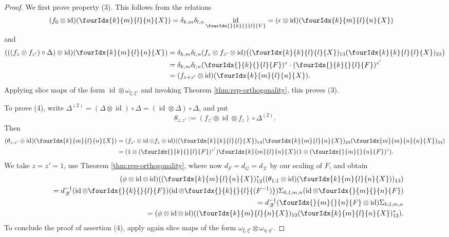 \documentclass[11pt]{article}
\DeclareMathOperator{\id}{id}
\newcommand{\Gr}[5]{\fourIdx{#2}{#4}{#3}{#5}{#1}}%
\newcommand{\Gru}[3]{\Gr{#1}{}{}{#2}{#3}}
\theoremstyle{definition}
\numberwithin{equation}{section}
\begin{document}
\begin{proof}
    We first prove property (3). This follows from the relations
    \begin{align*}
      (f_{0}  \otimes \id)(\Gr{X}{k}{l}{m}{n}) &=
      \delta_{k,m}\delta_{l,n} \id_{\Gru{V}{k}{l}} =
      (\epsilon \otimes \id)(\Gr{X}{k}{l}{m}{n})
    \end{align*}
    and
    \begin{align*}
      (((f_{z}\otimes f_{z'})\circ \Delta) \otimes
      \id)(\Gr{X}{k}{l}{m}{n}) &=  \delta_{k,m}\delta_{l,n}(f_{z} \otimes f_{z'} \otimes
      \id)\big((\Gr{X}{k}{l}{k}{l})_{13}
      (\Gr{X}{k}{l}{k}{l})_{23}\big) \\
      &=  \delta_{k,m}\delta_{l,n}(\Gru{F}{k}{l})^{z}  \cdot (\Gru{F}{k}{l})^{z'} \\
      &= (f_{z+z'} \otimes \id)(\Gr{X}{k}{l}{m}{n}).
    \end{align*}
    Applying slice maps of the form $\id
    \otimes \omega_{\xi,\xi'}$ and invoking Theorem \ref{thm:rep-orthogonality}, this proves (3).

To prove (4), write $ \Delta^{(2)} = (
    \Delta \otimes \id)\circ  \Delta = (\id \otimes 
    \Delta) \circ \Delta$, and put \[\theta_{z,z'}:=(f_{z'} \otimes \id
    \otimes f_{z})\circ  \Delta^{(2)}.\] Then
    \begin{align*}
      (\theta_{z,z'} \otimes \id)(\Gr{X}{k}{l}{m}{n}) &= (f_{z'} \otimes
      \id \otimes f_{z} \otimes
      \id)((\Gr{X}{k}{l}{k}{l})_{14}(\Gr{X}{k}{l}{m}{n})_{24}(\Gr{X}{m}{n}{m}{n})_{34})
      \\
      &= (1 \otimes (\Gru{F}{k}{l})^{z'}) \Gr{X}{k}{l}{m}{n} (1
      \otimes (\Gru{F}{m}{n})^{z}).
    \end{align*}
    We take $z=z'=1$, use Theorem \ref{thm:rep-orthogonality}, where
    now $d_F= d_G=d_{\mathscr{X}}$ by our scaling of $F$, and obtain
    \begin{eqnarray*}
     && \hspace{-2cm} (\phi \otimes \id \otimes
      \id)((\Gr{X}{k}{l}{m}{n})_{12}^{*}((\theta_{1,1} \otimes
      \id)(\Gr{X}{k}{l}{m}{n}))_{13})\\ && =d_{\mathscr{X}}^{-1}(\id \otimes
      \Gru{F}{k}{l}) (\id \otimes \Gru{(F^{-1})}{k}{l})
      \Sigma_{k,l,m,n} (\id \otimes
      \Gru{F}{m}{n}) \\
      &&=d_{\mathscr{X}}^{-1}(\Gru{F}{m}{n} \otimes \id) \Sigma_{k,l,m,n} \\
      &&= (\phi \otimes \id \otimes
      \id)((\Gr{X}{k}{l}{m}{n})_{13}(\Gr{X}{k}{l}{m}{n})_{12}^{*}).
    \end{eqnarray*}
    To conclude the proof of assertion (4), apply again slice maps of the form
    $\omega_{\xi,\xi'} \otimes \omega_{\eta,\eta'}$.


\end{proof}
\end{document}
